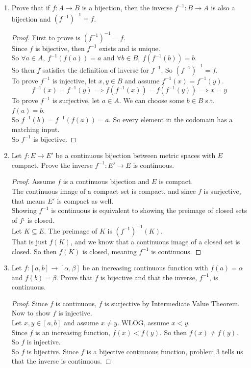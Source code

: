 \documentclass[14pt]{extarticle}
\begin{document}
\begin{enumerate}
		\item Prove that if $f:A \rightarrow B$ is a bijection, then the inverse $f^{-1}:B \rightarrow A$ is also a bijection and $(f^{-1})^{-1} = f$.
		\begin{proof}
			First to prove is $(f^{-1})^{-1} = f$.\\
			Since $f$ is bijective, then $f^{-1}$ exists and is unique.\\
			So $\forall a \in A,\ f^{-1}(f(a)) = a$ and $\forall b \in B,\ f(f^{-1}(b)) = b$.\\
			So then $f$ satisfies the definition of inverse for $f^{-1}$. So $(f^{-1})^{-1} = f$.\\
			To prove $f^{-1}$ is injective, let $x,y \in B$ and assume $f^{-1}(x) =f^{-1}(y)$.\\
			\[f^{-1}(x) =f^{-1}(y) \implies f(f^{-1}(x)) = f(f^{-1}(y)) \implies x=y\]
			To prove $f^{-1}$ is surjective, let $a \in A$. We can choose some $b \in B$ s.t. $f(a) = b$.\\
			So $f^{-1}(b) = f^{-1}(f(a)) = a$. So every element in the codomain has a matching input.\\
			So $f^{-1}$ is bijective.
		\end{proof}
		
		\item Let $f:E \rightarrow E'$ be a continuous bijection between metric spaces with $E$ compact. Prove the inverse $f^{-1}:E' \rightarrow E$ is continuous.
		\begin{proof}
			Assume $f$ is a continuous bijection and $E$ is compact.\\
			The continuous image of a compact set is compact, and since $f$ is surjective, that means $E'$ is compact as well.\\
			Showing $f^{-1}$ is continuous is equivalent to showing the preimage of closed sets of $f^{_1}$ is closed.\\
			Let $K \subseteq E$. The preimage of $K$ is $(f^{-1})^{-1}(K)$.\\
			That is just $f(K)$, and we know that a continuous image of a closed set is closed. So then $f(K)$ is closed, meaning $f^{-1}$ is continuous.
		\end{proof}
		
		\item Let $f:[a,b] \rightarrow [\alpha,\beta]$ be an increasing continuous function with $f(a)=\alpha$ and $f(b)=\beta$. Prove that $f$ is bijective and that the inverse, $f^{-1}$, is continuous.
		\begin{proof}
			Since $f$ is continuous, $f$ is surjective by Intermediate Value Theorem. Now to show $f$ is injective.\\
			Let $x,y \in [a,b]$ and assume $x \neq y$. WLOG, assume $x<y$.\\
			Since $f$ is an increasing function, $f(x)<f(y)$. So then $f(x) \neq f(y)$. So $f$ is injective.\\
			So $f$ is bijective. Since $f$ is a bijective continuous function, problem 3 tells us that the inverse is continuous.
		\end{proof}
		

\end{enumerate}
\end{document}
